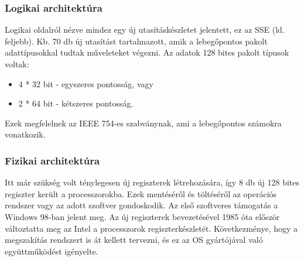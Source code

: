 \subsubsection{Logikai architektúra}
Logikai oldalról nézve mindez egy új utasításkészletet jelentett, ez az SSE (ld. feljebb).
Kb. 70 db új utasítást tartalmazott, amik a lebegőpontos pakolt adattípusokkal tudtak műveleteket végezni.
Az adatok 128 bites pakolt típusok voltak:
\begin{itemize}
    \item 4 * 32 bit - egyszeres pontosság, vagy
    \item 2 * 64 bit - kétszeres pontosság.
\end{itemize}
Ezek megfelelnek az IEEE 754-es szabványnak, ami a lebegőpontos számokra vonatkozik.
\subsubsection{Fizikai architektúra}
Itt már szükség volt ténylegesen új regiszterek létrehozására, így 8 db új 128 bites regiszter került a processzorokba.
Ezek mentéséről és töltéséről az operációs rendszer vagy az adott szoftver gondoskodik.
Az első szoftveres támogatás a Windows 98-ban jelent meg.
Az új regiszterek bevezetésével 1985 óta először változtatta meg az Intel a processzorok regiszterkészletét.
Következménye, hogy a megszakítás rendszert is át kellett tervezni, és ez az OS gyártójával való együttműködést igényelte.